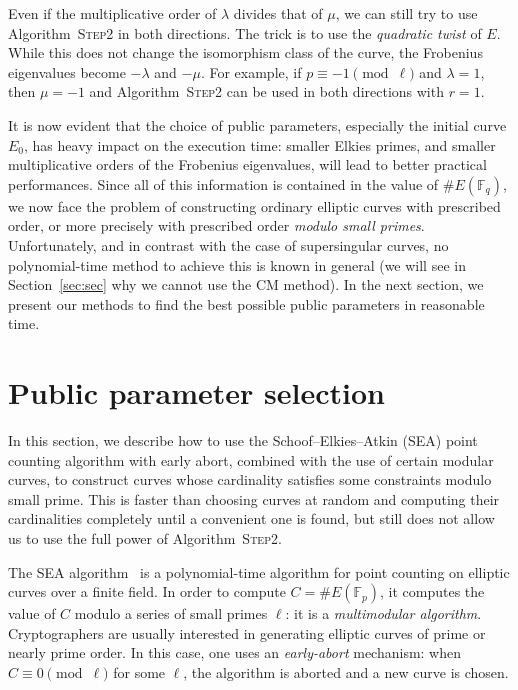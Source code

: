 \documentclass{article}
\newcommand{\F}{\mathbb{F}}
\newcommand{\algstyle}[1]{\textsc{#1}}
\theoremstyle{definition}
\begin{document}
Even if the multiplicative order of $\lambda$ divides that of $\mu$,
we can still try to use Algorithm~\algstyle{Step2} in both directions.
The trick is to use the \emph{quadratic twist} of $E$. While this does not
change the isomorphism class of the curve, the Frobenius eigenvalues
become $-\lambda$ and $-\mu$. For example, if
$p \equiv -1\pmod{\ell}$ and $\lambda = 1$, then $\mu=-1$ and 
Algorithm~\algstyle{Step2} can be used in both directions with $r=1$.


It is now evident that the choice of public parameters, especially
the initial curve $E_0$, has heavy impact on the execution time:
smaller Elkies primes,
and smaller multiplicative orders of the Frobenius eigenvalues, will
lead to better practical performances. Since all of this information
is contained in the value of $\# E(\F_q)$, we now face the problem
of constructing ordinary elliptic curves with prescribed
order, or more precisely with prescribed order \emph{modulo small
primes}. Unfortunately, and in contrast with the case of
supersingular curves, no polynomial-time method to achieve this 
is known in general (we will see in Section~\ref{sec:sec} why
we cannot use the CM method).
In the next section, we present our methods to find the best possible
public parameters in reasonable time.

\section{Public parameter selection}
\label{sec:initcurve}


In this section, we describe how to use the Schoof--Elkies--Atkin (SEA) point counting
algorithm with early abort, combined with the use of certain modular curves,
to construct curves whose cardinality satisfies some constraints
modulo small prime.
This is faster than choosing curves at random and computing their cardinalities
completely until a convenient one is found, but still does not allow us
to use the full power of Algorithm~\algstyle{Step2}.

The SEA algorithm~\cite{schoof95,todo} is a polynomial-time algorithm for
point counting on elliptic curves over a finite field. In order to compute
$C = \# E(\F_p)$, it computes the value of $C$ modulo a series
of small primes $\ell$: it is a \emph{multimodular algorithm}.
Cryptographers are usually interested in generating elliptic curves of
prime or nearly prime order. In this case, one uses an \emph{early-abort}
mechanism: when $C \equiv 0\pmod{\ell}$ for some $\ell$, the algorithm is aborted
and a new curve is chosen.
\end{document}
